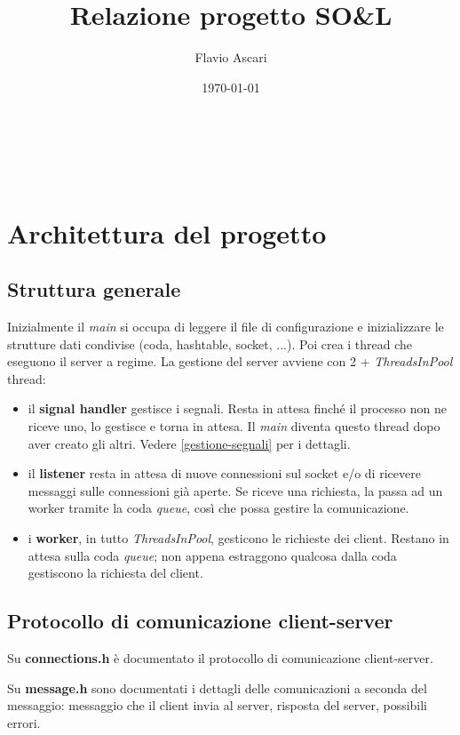 \documentclass[a4paper]{article}
\title{Relazione progetto SO\&L}\let\Title\@title
\author{Flavio Ascari}\let\Author\@author
\date{\today}\let\Date\@date
\theoremstyle{theorem}
\theoremstyle{remark}
\theoremstyle{definition}
\theoremstyle{corollary}
\theoremstyle{lemma}
\newcommand\file[1]{%
	\textbf{#1}}
\newcommand\codeName[1]{%
	\textit{#1}}
\begin{document}
\begin{center}
	\vspace*{0,5 cm}
	{\Huge \textsc{\Title}} \\
	\vspace{0,5 cm}
	\textsc{\Author} \
	\textsc{\Date}
	\thispagestyle{empty}
	\vspace{0,7 cm}
\end{center}
\small

\tableofcontents
\clearpage




\section{Architettura del progetto}
\subsection{Struttura generale}
Inizialmente il \codeName{main} si occupa di leggere il file di configurazione e inizializzare le strutture dati condivise (coda, hashtable, socket, ...). Poi crea i thread che eseguono il server a regime.
La gestione del server avviene con 2 + \codeName{ThreadsInPool} thread:
\begin{itemize}
	\item il \textbf{signal handler} gestisce i segnali. Resta in attesa finché il processo non ne riceve uno, lo gestisce e torna in attesa. Il \codeName{main} diventa questo thread dopo aver creato gli altri. Vedere \autoref{gestione-segnali} per i dettagli.
	\item il \textbf{listener} resta in attesa di nuove connessioni sul socket e/o di ricevere messaggi sulle connessioni già aperte. Se riceve una richiesta, la passa ad un worker tramite la coda \codeName{queue}, così che possa gestire la comunicazione.
	\item i \textbf{worker}, in tutto \codeName{ThreadsInPool}, gesticono le richieste dei client. Restano in attesa sulla coda \codeName{queue}; non appena estraggono qualcosa dalla coda gestiscono la richiesta del client.
\end{itemize}


\subsection{Protocollo di comunicazione client-server}
Su \file{connections.h} è documentato il protocollo di comunicazione client-server.

Su \file{message.h} sono documentati i dettagli delle comunicazioni a seconda del messaggio: messaggio che il client invia al server, risposta del server, possibili errori.
\end{document}
